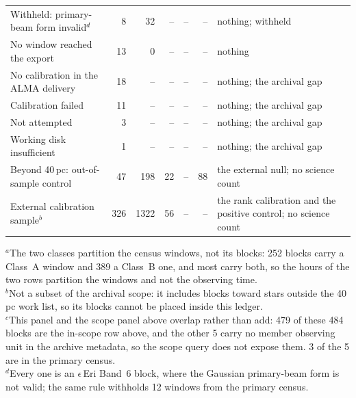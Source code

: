 \begin{tabular}{@{}p{}rrrrrp{}@{}}
\hspace{2.2em}Withheld: primary-beam form invalid$^{d}$ & 8 & 32 & -- & -- & -- & nothing; withheld \\
\hspace{2.2em}No window reached the export & 13 & 0 & -- & -- & -- & nothing \\
\hspace{1.1em}No calibration in the ALMA delivery & 18 & -- & -- & -- & -- & nothing; the archival gap \\
\hspace{1.1em}Calibration failed & 11 & -- & -- & -- & -- & nothing; the archival gap \\
\hspace{1.1em}Not attempted & 3 & -- & -- & -- & -- & nothing; the archival gap \\
\hspace{1.1em}Working disk insufficient & 1 & -- & -- & -- & -- & nothing; the archival gap \\
\hline
Beyond 40\,pc: out-of-sample control & 47 & 198 & 22 & -- & 88 & the external null; no science count \\
External calibration sample$^{b}$ & 326 & 1322 & 56 & -- & -- & the rank calibration and the positive control; no science count \\
\hline
\end{tabular}

{\footnotesize $^{a}$The two classes partition the census windows, not its blocks: 252 blocks carry a Class~A window and 389 a Class~B one, and most carry both, so the hours of the two rows partition the windows and not the observing time.\\ $^{b}$Not a subset of the archival scope: it includes blocks toward stars outside the 40\,pc work list, so its blocks cannot be placed inside this ledger.\\ $^{c}$This panel and the scope panel above overlap rather than add: 479 of these 484 blocks are the in-scope row above, and the other 5 carry no member observing unit in the archive metadata, so the scope query does not expose them. 3 of the 5 are in the primary census.\\ $^{d}$Every one is an $\epsilon$\,Eri Band~6 block, where the Gaussian primary-beam form is not valid; the same rule withholds 12 windows from the primary census.}

